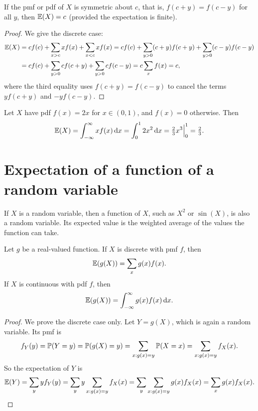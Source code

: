 \begin{proposition}\label{prop:symmetric-expectation}
If the pmf or pdf of $X$ is symmetric about $c$, that is, $f(c + y) = f(c - y)$ for all $y$, then $\operatorname{\mathbb{E}}(X) = c$ (provided the expectation is finite).
\end{proposition}

\begin{proof}
We give the discrete case:
\begin{align*}
  \operatorname{\mathbb{E}}(X) &= c f(c) + \sum_{x > c} x f(x) + \sum_{x < c} x f(x)
        = c f(c) + \sum_{y > 0} (c + y) f(c + y) + \sum_{y > 0} (c - y) f(c - y) \\
       &= c f(c) + \sum_{y > 0} c f(c + y) + \sum_{y > 0} c f(c - y)
        = c \sum_x f(x) = c,
\end{align*}
where the third equality uses $f(c+y) = f(c-y)$ to cancel the terms $y f(c+y)$ and $-y f(c-y)$.
\end{proof}

\begin{example}\label{ex:expectation-2x}
Let $X$ have pdf $f(x) = 2x$ for $x \in (0, 1)$, and $f(x) = 0$ otherwise. Then
\[
  \operatorname{\mathbb{E}}(X) = \int_{-\infty}^{\infty} x f(x) \mathop{}\!\mathrm{d} x = \int_0^1 2x^2 \mathop{}\!\mathrm{d} x = \tfrac23 x^3 \Big|_0^1 = \tfrac23.
\]
\end{example}

\section{Expectation of a function of a random variable}\label{sec:expectation-of-function}

If $X$ is a random variable, then a function of $X$, such as $X^2$ or $\sin(X)$, is also a random variable. Its expected value is the weighted average of the values the function can take.

\begin{theorem}\label{thm:lotus}
Let $g$ be a real-valued function. If $X$ is discrete with pmf $f$, then
\[
  \operatorname{\mathbb{E}}(g(X)) = \sum_x g(x) f(x).
\]
If $X$ is continuous with pdf $f$, then
\[
  \operatorname{\mathbb{E}}(g(X)) = \int_{-\infty}^{\infty} g(x) f(x) \mathop{}\!\mathrm{d} x.
\]
\end{theorem}

\begin{proof}
We prove the discrete case only. Let $Y = g(X)$, which is again a random variable. Its pmf is
\[
  f_Y(y) = \mathbb{P}(Y = y) = \mathbb{P}(g(X) = y) = \sum_{x : g(x) = y} \mathbb{P}(X = x) = \sum_{x : g(x) = y} f_X(x).
\]
So the expectation of $Y$ is
\[
  \operatorname{\mathbb{E}}(Y) = \sum_y y f_Y(y) = \sum_y y \sum_{x : g(x) = y} f_X(x) = \sum_y \sum_{x : g(x) = y} g(x) f_X(x) = \sum_x g(x) f_X(x). \qedhere
\]
\end{proof}

